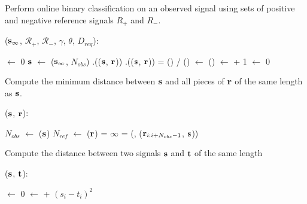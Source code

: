 \begin{algorithm}
\caption{Perform online binary classification on an observed signal
    using sets of positive and negative reference signals $R_+$ and $R_-$.}
\label{alg:Detect}
($\mathbf s_{\infty}$, $\mathcal{R}_+$, $\mathcal{R}_-$, $\gamma$, $\theta$,
$D_{req}$):
\begin{algorithmic}[1]
\STATE {} $\leftarrow$ 0
\LOOP
  \STATE $\mathbf s$ $\leftarrow$ ($\mathbf s_{\infty}$, $N_{obs}$)
    \STATE {}.(($\mathbf s$, $\mathbf r$))
  \ENDFOR
    \STATE {}.(($\mathbf s$, $\mathbf r$))
  \ENDFOR
  \STATE {} = () / ()
      \STATE {} $\leftarrow$ ()
      \RETURN {}
    \ELSE
      \STATE {} $\leftarrow$  + 1
    \ENDIF
  \ELSE
    \STATE {} $\leftarrow$ 0
  \ENDIF
\ENDLOOP
\end{algorithmic}
\end{algorithm}

\begin{algorithm}
\caption{Compute the minimum distance between $\mathbf s$ and all pieces of $\mathbf r$
  of the same length as $\mathbf s$.}
\label{alg:DistToReference}
($\mathbf s$, $\mathbf r$):
\begin{algorithmic}[1]
  \STATE $N_{obs}$ $\leftarrow$ ($\mathbf s$)
  \STATE $N_{ref}$ $\leftarrow$ ($\mathbf r$)
  \STATE {} = $\infty$
    \STATE {} = (, ($\mathbf r_{i:i+N_{obs}-1}$, $\mathbf s$))
  \ENDFOR
  \RETURN {}
\end{algorithmic}
\end{algorithm}

\begin{algorithm}
\caption{Compute the distance between two signals $\mathbf s$ and $\mathbf t$ of the same
    length}
\label{alg:DistToSignal}
($\mathbf s$, $\mathbf t$):
\begin{algorithmic}[1]
\STATE {} $\leftarrow$ 0
  \STATE {} $\leftarrow$  + $(s_i - t_i)^2$
\ENDFOR
\RETURN {}
\end{algorithmic}
\end{algorithm}
